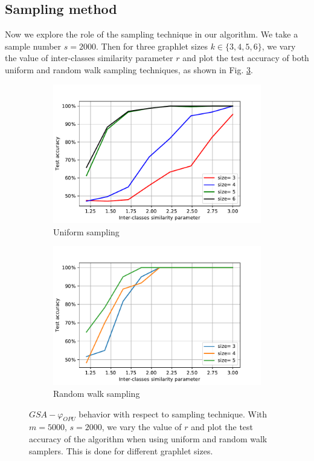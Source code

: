 \subsection{Sampling method}
Now we explore the role of the sampling technique in our algorithm. We take a sample number $s=2000$.
Then for three graphlet sizes $k\in\{3,4,5,6\}$, we vary the value of inter-classes similarity parameter $r$ and plot the test accuracy of both uniform and random walk sampling techniques, as shown in Fig. \ref{fig:comp_sampling}.
\begin{figure}
     \centering
     \begin{subfigure}[b]{0.49\textwidth}
         \centering
         \includegraphics[width=\textwidth]{figs/LightOn_adj_SBM_Similarity_graphlet_size.pdf}
         \caption{Uniform sampling}
         \label{fig:y equals x}
     \end{subfigure}
     \hfill
     \begin{subfigure}[b]{0.49\textwidth}
         \centering
         \includegraphics[width=\textwidth]{figs/LightOn_adj_SBM_similarity_graphlet_size_RW.pdf}
         \caption{Random walk sampling}
         \label{fig:three sin x}
     \end{subfigure}
        \caption [$GSA-\varphi_{OPU}$ behavior with respect to sampling technique]{$GSA-\varphi_{OPU}$ behavior with respect to sampling technique. With $m=5000$, $s=2000$, we vary the value of $r$ and plot the test accuracy of the algorithm when using uniform and random walk samplers. This is done for different graphlet sizes.}
\label{fig:comp_sampling}
\end{figure}
